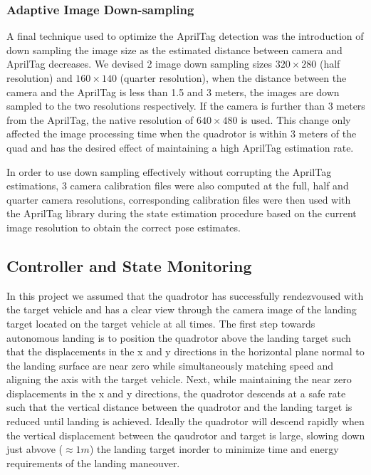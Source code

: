 \documentclass[11pt, twocolumn]{article}
\begin{document}
\subsubsection{Adaptive Image Down-sampling}
A final technique used to optimize the AprilTag detection was the introduction of down sampling the image size as the estimated distance between camera and AprilTag decreases. We devised 2 image down sampling sizes $320 \times 280$ (half resolution) and $160 \times 140$ (quarter resolution), when the distance between the camera and the AprilTag is less than 1.5 and 3 meters, the images are down sampled to the two resolutions respectively. If the camera is further than 3 meters from the AprilTag, the native resolution of $640 \times 480$ is used. This change only affected the image processing time when the quadrotor is within 3 meters of the quad and has the desired effect of maintaining a high AprilTag estimation rate.

In order to use down sampling effectively without corrupting the AprilTag estimations, 3 camera calibration files were also computed at the full, half and quarter camera resolutions, corresponding calibration files were then used with the AprilTag library during the state estimation procedure based on the current image resolution to obtain the correct pose estimates. 

\subsection{Controller and State Monitoring}
In this project we assumed that the quadrotor has successfully rendezvoused with the target vehicle and has a clear view through the camera image of the landing target located on the target vehicle at all times. The first step towards autonomous landing is to position the quadrotor above the landing target such that the displacements in the x and y directions in the horizontal plane normal to the landing surface are near zero while simultaneously matching speed and aligning the axis with the target vehicle. Next, while maintaining the near zero displacements in the x and y directions, the quadrotor descends at a safe rate such that the vertical distance between the quadrotor and the landing target is reduced until landing is achieved. Ideally the quadrotor will descend rapidly when the vertical displacement between the qaudrotor and target is large, slowing down just abvove ($\approx 1m$) the landing target inorder to minimize time and energy requirements of the landing maneouver. 
\end{document}
